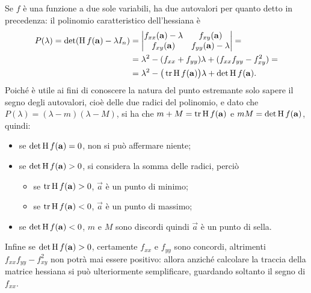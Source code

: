 Se $f$ è una funzione a due sole variabili, ha due autovalori per quanto detto in precedenza: il polinomio caratteristico dell'hessiana è
\begin{equation}\begin{split}
P(\lambda)=\det(\operatorname{H} f(\mathbf{a})-\lambda I_n)	&=\begin{vmatrix}f_{xx}(\mathbf{a})-\lambda&f_{xy}(\mathbf{a})\\f_{xy}(\mathbf{a})&f_{yy}(\mathbf{a})-\lambda\end{vmatrix}=\\
										&=\lambda^2-(f_{xx}+f_{yy})\lambda+(f_{xx}f_{yy}-f_{xy}^2)=\\
										&=\lambda^2-\big(\operatorname{tr}\operatorname{H} f(\mathbf{a})\big)\lambda+\det\operatorname{H} f(\mathbf{a}).
\end{split}\end{equation}
Poiché è utile ai fini di conoscere la natura del punto estremante solo sapere il segno degli autovalori, cioè delle due radici del polinomio, e dato che $P(\lambda)=(\lambda-m)(\lambda-M)$, si ha che $m+M=\operatorname{tr}\operatorname{H} f(\mathbf{a})$ e $mM=\det\operatorname{H} f(\mathbf{a})$, quindi:
\begin{itemize}
\item se $\det\operatorname{H} f(\mathbf{a})=0$, non si può affermare niente;
\item se $\det\operatorname{H} f(\mathbf{a})>0$, si considera la somma delle radici, perciò
	\begin{itemize}
	\item se $\operatorname{tr}\operatorname{H} f(\mathbf{a})>0$, $\vec a$ è un punto di minimo;
	\item se $\operatorname{tr}\operatorname{H} f(\mathbf{a})<0$, $\vec a$ è un punto di massimo;
	\end{itemize}
\item se $\det\operatorname{H} f(\mathbf{a})<0$, $m$ e $M$ sono discordi quindi $\vec a$ è un punto di sella.
\end{itemize}
Infine se $\det\operatorname{H} f(\mathbf{a})>0$, certamente $f_{xx}$ e $f_{yy}$ sono concordi, altrimenti $f_{xx}f_{yy}-f_{xy}^2$ non potrà mai essere positivo: allora anziché calcolare la traccia della matrice hessiana si può ulteriormente semplificare, guardando soltanto il segno di $f_{xx}$.
